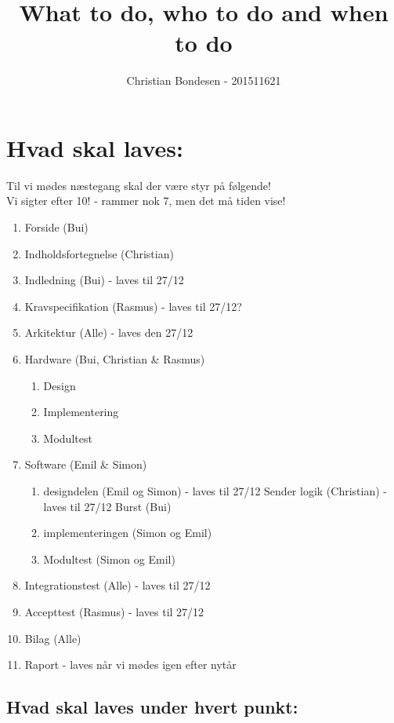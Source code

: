 \documentclass[11pt]{article}
\title{What to do, who to do and when to do}
\author{Christian Bondesen - 201511621}
\begin{document}
\maketitle
\section{Hvad skal laves:}

Til vi mødes næstegang skal der være styr på følgende!\\
Vi sigter efter 10! - rammer nok 7, men det må tiden vise!

\begin{enumerate}
	\item Forside (Bui) %
	\item Indholdsfortegnelse (Christian) \checkmark
	\item Indledning (Bui) - laves til 27/12
	\item Kravspecifikation (Rasmus) - laves til 27/12?
	\item Arkitektur (Alle) - laves den 27/12
	
	\item Hardware (Bui, Christian \& Rasmus)
	\begin{enumerate}
		\item Design 
		\item Implementering
		\item Modultest
	\end{enumerate}

	\item Software (Emil \& Simon)
	\begin{enumerate}
		\item designdelen (Emil og Simon) - laves til 27/12
		\subitem Sender logik (Christian) - laves til 27/12
		\subitem Burst (Bui)
		\item implementeringen (Simon og Emil)
		\item Modultest (Simon og Emil)
	\end{enumerate}
	\item Integrationstest (Alle) - laves til 27/12
	\item Accepttest (Rasmus) - laves til 27/12
	\item Bilag (Alle) 
	\item Raport - laves når vi mødes igen efter nytår
\end{enumerate}

\subsection{Hvad skal laves under hvert punkt: }
\end{document}
